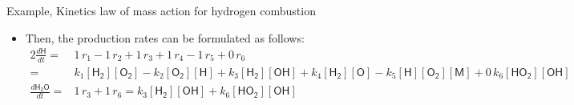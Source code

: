 \begin{frame}{Example, Kinetics law of mass action for hydrogen combustion}
\begin{itemize}
	\item Then, the production rates can be formulated as follows: 
	{\footnotesize
	\begin{alignat*}{2}
		\tfrac{d\mathsf{H}}{dt} = & 1 \, r_1 - 1 \, r_2 + 1 \, r_3 + 1 \, r_4 -  1 \, r_5 + 0 \, r_6\\
								  = &  k_1  \mathsf{[H_2][O_2] } - k_2  \mathsf{[O_2][H] } + k_3  \mathsf{[H_2][OH]}  + k_4  \mathsf{[H_2][O] } -  k_5  \mathsf{[H][O_2][M]} + 0 \, k_6  \mathsf{[HO_2][OH] }\\
		\tfrac{d\mathsf{H_2O}}{dt} = & 1 \, r_3 + 1 \, r_6 
		= k_3  \mathsf{[H_2][OH]} + k_6  \mathsf{[HO_2][OH] }\\
	\end{alignat*}
	}
	\end{itemize}
\end{frame}
%
%
